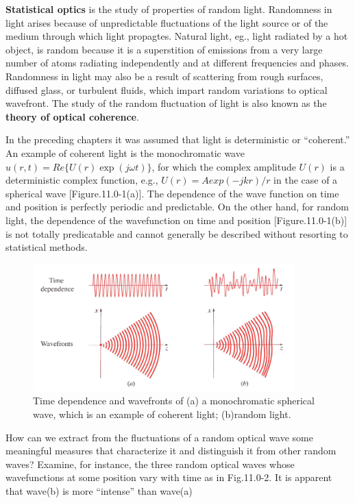 \documentclass{article}
\numberwithin{figure}{subsection}
\numberwithin{table}{subsection}
\begin{document}
\newpage\textbf{Statistical optics} is the study of properties of random light. Randomness in light
arises because of unpredictable fluctuations of the light source or of the medium 
through which light propagtes. Natural light, eg., light radiated by a hot object, is
random because it is a superstition of emissions from a very large number of atoms
radiating independently and at different frequencies and phases. Randomness in light
may also be a result of scattering from rough surfaces, diffused glass, or turbulent 
fluids, which impart random variations to optical wavefront. The study of the
random fluctuation of light is also known as the \textbf{theory of optical coherence}.
\par In the preceding chapters it was assumed that light is deterministic or  ``coherent.'' An
example of   coherent light is the monochromatic wave $ u(r,t) = Re \{ U(r) \exp(j\omega t) \}$,
for which the complex amplitude $ U(r) $ is a deterministic complex function, e.g., 
$ U(r) = Aexp(-jkr)/r $ in the case of  a spherical wave [Figure.11.0-1(a)].
The dependence of the wave function on time and position is perfectly periodic and 
predictable. On the other hand, for random light, the dependence of the wavefunction 
on time and position [Figure.11.0-1(b)] is not totally predicatable and cannot generally be 
described without resorting to statistical methods.  
\begin{figure}[H]
\centering
\includegraphics[width=0.9\textwidth]{11_0_1.PNG}
\caption{Time dependence and wavefronts of (a) a monochromatic spherical wave, which is an example of coherent light;
(b)random light.}
\label{fig: 11_0_1}
\end{figure}
\par How can we extract from the fluctuations of a random optical wave some meaningful
measures that characterize it and distinguish it from other random waves? Examine, for
instance, the three random optical waves whose wavefunctions at some position 
vary with time as in Fig.11.0-2. It is apparent that wave(b) is more ``intense'' than wave(a)
\end{document}

